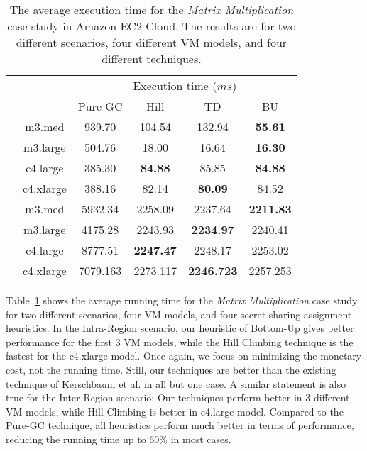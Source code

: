 \documentclass{llncs}
\begin{document}
\begin{table}[hbt]
	\scriptsize
	\centering
	\begin{tabular}{|c|c|c|c|c|c|}
	
	\cline{3-6}
	\multicolumn{2}{c|}{} & \multicolumn{4}{|c|}{Execution time ($ms$)} \\
	\cline{3-6}
	\multicolumn{2}{c|}{} & Pure-GC & Hill & TD & BU \\
	\hline
	
	\parbox[t]{2mm}{} 
 & m3.med & 939.70 & 104.54 & 132.94 & \textbf{55.61} \\
 & m3.large & 504.76 & 18.00 & 16.64 & \textbf{16.30} \\
 & c4.large & 385.30 & \textbf{84.88} & 85.85 & \textbf{84.88} \\
 & c4.xlarge & 388.16 & 82.14 & \textbf{80.09} & 84.52 \\		
	\hline		
	\parbox[t]{2mm}{} 
 & m3.med & 5932.34 & 2258.09 & 2237.64 & \textbf{2211.83} \\
 & m3.large & 4175.28 & 2243.93 & \textbf{2234.97} & 2240.41 \\
 & c4.large & 8777.51 & \textbf{2247.47} & 2248.17 & 2253.02 \\
 & c4.xlarge & 7079.163 & 2273.117 & \textbf{2246.723} & 2257.253 \\
	\hline
	\end{tabular}

	\caption{The average execution time for the \emph{Matrix Multiplication} case study in Amazon EC2 Cloud. The results are for two different scenarios, four different VM models, and four different techniques.}
	\label{table:case:matrix:run}
\end{table}

\vspace{-0.4cm}
Table~\ref{table:case:matrix:run} shows the average running time for the \emph{Matrix Multiplication} case study for two different scenarios, four VM models, and four secret-sharing assignment heuristics. In the Intra-Region scenario, our heuristic of Bottom-Up gives better performance for the first $3$ VM models, while the Hill Climbing technique is the fastest for the c4.xlarge model. Once again, we focus on minimizing the monetary cost, not the running time. Still, our techniques are better than the existing technique of Kerschbaum et al. in all but one case. A similar statement is also true for the Inter-Region scenario: Our techniques perform better in $3$ different VM models, while Hill Climbing is better in c4.large model. Compared to the Pure-GC technique, all heuristics perform much better in terms of performance, reducing the running time up to $60\%$ in most cases. 
\end{document}
